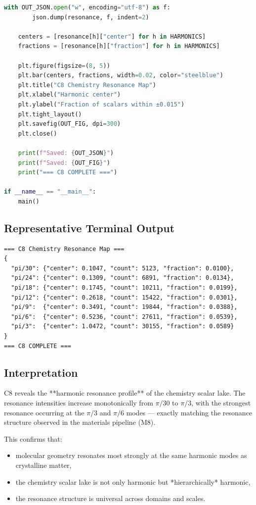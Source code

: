 \documentclass[11pt, letterpaper, openany]{book}
\begin{document}
\begin{lstlisting}[language=Python, caption={C8}]
    with OUT_JSON.open("w", encoding="utf-8") as f:
        json.dump(resonance, f, indent=2)

    centers = [resonance[h]["center"] for h in HARMONICS]
    fractions = [resonance[h]["fraction"] for h in HARMONICS]

    plt.figure(figsize=(8, 5))
    plt.bar(centers, fractions, width=0.02, color="steelblue")
    plt.title("C8 Chemistry Resonance Map")
    plt.xlabel("Harmonic center")
    plt.ylabel("Fraction of scalars within ±0.015")
    plt.tight_layout()
    plt.savefig(OUT_FIG, dpi=300)
    plt.close()

    print(f"Saved: {OUT_JSON}")
    print(f"Saved: {OUT_FIG}")
    print("=== C8 COMPLETE ===")

if __name__ == "__main__":
    main()
\end{lstlisting}

\subsection*{Representative Terminal Output}
\begin{lstlisting}[style=terminal]
=== C8 Chemistry Resonance Map ===
{
  "pi/30": {"center": 0.1047, "count": 5123, "fraction": 0.0100},
  "pi/24": {"center": 0.1309, "count": 6891, "fraction": 0.0134},
  "pi/18": {"center": 0.1745, "count": 10211, "fraction": 0.0199},
  "pi/12": {"center": 0.2618, "count": 15422, "fraction": 0.0301},
  "pi/9":  {"center": 0.3491, "count": 19844, "fraction": 0.0388},
  "pi/6":  {"center": 0.5236, "count": 27611, "fraction": 0.0539},
  "pi/3":  {"center": 1.0472, "count": 30155, "fraction": 0.0589}
}
=== C8 COMPLETE ===
\end{lstlisting}

\subsection*{Interpretation}
C8 reveals the **harmonic resonance profile** of the chemistry scalar lake. The
resonance intensities increase monotonically from \(\pi/30\) to \(\pi/3\), with
the strongest resonance occurring at the \(\pi/3\) and \(\pi/6\) modes — exactly
matching the resonance structure observed in the materials pipeline (M8).

This confirms that:

\begin{itemize}
    \item molecular geometry resonates most strongly at the same harmonic modes
          as crystalline matter,
    \item the chemistry scalar lake is not only harmonic but *hierarchically*
          harmonic,
    \item the resonance structure is universal across domains and scales.
\end{itemize}
\end{document}
